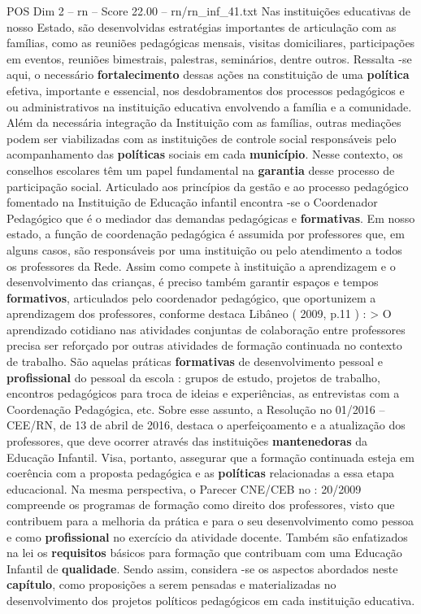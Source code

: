 \begin{textsample}{POS Dim 2 – rn – Score 22.00 – rn/rn\_inf\_41.txt}
Nas instituições educativas de nosso Estado, são desenvolvidas estratégias importantes de articulação com as famílias, como as reuniões pedagógicas mensais, visitas domiciliares, participações em eventos, reuniões bimestrais, palestras, seminários, dentre outros.
Ressalta -se aqui, o necessário \textbf{fortalecimento} dessas ações na constituição de uma \textbf{política} efetiva, importante e essencial, nos desdobramentos dos processos pedagógicos e ou administrativos na instituição educativa envolvendo a família e a comunidade.
Além da necessária integração da Instituição com as famílias, outras mediações podem ser viabilizadas com as instituições de controle social responsáveis pelo acompanhamento das \textbf{políticas} sociais em cada \textbf{município}.
Nesse contexto, os conselhos escolares têm um papel fundamental na \textbf{garantia} desse processo de participação social.
Articulado aos princípios da gestão e ao processo pedagógico fomentado na Instituição de Educação infantil encontra -se o Coordenador Pedagógico que é o mediador das demandas pedagógicas e \textbf{formativas}.
Em nosso estado, a função de coordenação pedagógica é assumida por professores que, em alguns casos, são responsáveis por uma instituição ou pelo atendimento a todos os professores da Rede.
Assim como compete à instituição a aprendizagem e o desenvolvimento das crianças, é preciso também garantir espaços e tempos \textbf{formativos}, articulados pelo coordenador pedagógico, que oportunizem a aprendizagem dos professores, conforme destaca Libâneo ( 2009, p.11 ) : > O aprendizado cotidiano nas atividades conjuntas de colaboração entre professores precisa ser reforçado por outras atividades de formação continuada no contexto de trabalho.
São aquelas práticas \textbf{formativas} de desenvolvimento pessoal e \textbf{profissional} do pessoal da escola : grupos de estudo, projetos de trabalho, encontros pedagógicos para troca de ideias e experiências, as entrevistas com a Coordenação Pedagógica, etc.
Sobre esse assunto, a Resolução no 01/2016 – CEE/RN, de 13 de abril de 2016, destaca o aperfeiçoamento e a atualização dos professores, que deve ocorrer através das instituições \textbf{mantenedoras} da Educação Infantil.
Visa, portanto, assegurar que a formação continuada esteja em coerência com a proposta pedagógica e as \textbf{políticas} relacionadas a essa etapa educacional.
Na mesma perspectiva, o Parecer CNE/CEB no : 20/2009 compreende os programas de formação como direito dos professores, visto que contribuem para a melhoria da prática e para o seu desenvolvimento como pessoa e como \textbf{profissional} no exercício da atividade docente.
Também são enfatizados na lei os \textbf{requisitos} básicos para formação que contribuam com uma Educação Infantil de \textbf{qualidade}.
Sendo assim, considera -se os aspectos abordados neste \textbf{capítulo}, como proposições a serem pensadas e materializadas no desenvolvimento dos projetos políticos pedagógicos em cada instituição educativa.

\end{textsample}
